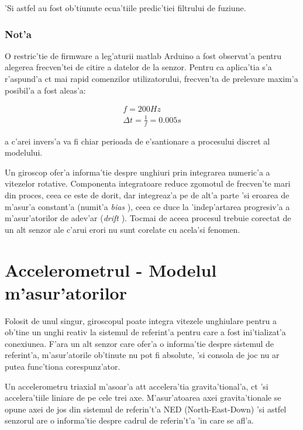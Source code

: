 \documentclass[12pt,a4paper,twoside]{report}
\begin{document}
'Si astfel au fost ob'tiunute ecua'tiile predic'tiei filtrului de fuziune.

\subsubsection{Not'a}

O restric'tie de firmware a leg'aturii matlab Arduino a fost observat'a pentru alegerea frecven'tei de citire a datelor de la senzor. Pentru ca aplica'tia s'a r'aspund'a c\ia t mai rapid comenzilor utilizatorului, frecven'ta de prelevare maxim'a posibil'a a fost aleas'a:

\begin{gather}
    f = 200 {Hz} \\ 
    \Delta t = \frac{1}{f} = 0.005 s
\end{gather}

a c'arei invers'a va fi chiar perioada de e'santionare a procesului discret al modelului.

\vspace{5px}

Un giroscop ofer'a informa'tie despre unghiuri prin integrarea numeric'a a vitezelor rotative. Componenta integratoare reduce zgomotul de frecven'te mari din proces, ceea ce este de dorit, dar integreaz'a pe de alt'a parte 'si eroarea de m'asur'a constant'a (numit'a \textit{bias} \cite{accel}), ceea ce duce la 'indep'artarea progresiv'a a m'asur'atorilor de adev'ar (\textit{drift} \cite{7334442}). Tocmai de aceea procesul trebuie corectat de un alt senzor ale c'arui erori nu sunt corelate cu acela'si fenomen.

\section{Accelerometrul - Modelul m'asur'atorilor}

Folosit de unul singur, giroscopul poate integra vitezele unghiulare pentru a ob'tine un unghi reativ la sistemul de referint'a pentru care a fost ini'tializat'a conexiunea. F'ara un alt senzor care ofer'a o informa'tie despre sistemul de referint'a, m'asur'atorile ob'tinute nu pot fi absolute, 'si consola de joc nu ar putea func'tiona corespunz'ator.

\vspace{5px}

Un accelerometru triaxial m'asoar'a at\ia t accelera'tia gravita'tional'a, c\ia t 'si accelera'tiile liniare de pe cele trei axe. M'asur'atoarea axei gravita'tionale se opune axei de jos din sistemul de referin't'a NED (North-East-Down) 'si astfel senzorul are o informa'tie despre cadrul de referin't'a 'in care se afl'a. 
\end{document}
